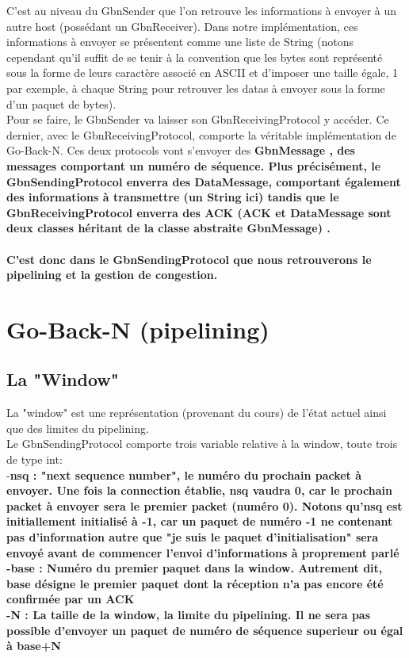 \documentclass[11pt]{article}
\begin{document}
C'est au niveau du GbnSender que l'on retrouve les informations à envoyer à un autre host (possédant un GbnReceiver). Dans notre implémentation, ces informations à envoyer se présentent comme une liste de String (notons cependant qu'il suffit de se tenir à la convention que les bytes sont représenté sous la forme de leurs caractère associé en ASCII et d'imposer une taille égale, 1 par exemple, à chaque String pour retrouver les datas à envoyer sous la forme d'un paquet de bytes). \\
Pour se faire, le GbnSender va laisser son GbnReceivingProtocol y accéder. Ce dernier, avec le GbnReceivingProtocol, comporte la véritable implémentation de Go-Back-N. Ces deux protocols vont s'envoyer des \bfseries GbnMessage \mdseries , des messages comportant un numéro de séquence. Plus précisément, le GbnSendingProtocol enverra des \bfseries DataMessage\mdseries , comportant également des informations à transmettre (un String ici) tandis que le GbnReceivingProtocol enverra des \bfseries ACK \mdseries (ACK et DataMessage sont deux classes héritant de la classe abstraite GbnMessage) .\\ 
\\
C'est donc dans le GbnSendingProtocol que nous retrouverons le pipelining et la gestion de congestion.


\section{Go-Back-N (pipelining)}
\subsection{La "Window"}
La "window" est une représentation (provenant du cours) de l'état actuel ainsi que des limites du pipelining. \\
Le GbnSendingProtocol comporte trois variable relative à la window, toute trois de type int: \\
-\bfseries nsq \mdseries : "next sequence number", le numéro du prochain packet à envoyer. Une fois la connection établie, nsq vaudra 0, car le prochain packet à envoyer sera le premier packet (numéro 0). Notons qu'nsq est initiallement initialisé à -1, car un paquet de numéro -1 ne contenant pas d'information autre que "je suis le paquet d'initialisation" sera envoyé avant de commencer l'envoi d'informations à proprement parlé \\
-\bfseries base \mdseries : Numéro du premier paquet dans la window. Autrement dit, base désigne le premier paquet dont la réception n'a pas encore été confirmée par un ACK \\
-\bfseries N \mdseries : La taille de la window, la limite du pipelining. Il ne sera pas possible d'envoyer un paquet de numéro de séquence superieur ou égal à base+N \\
\end{document}
